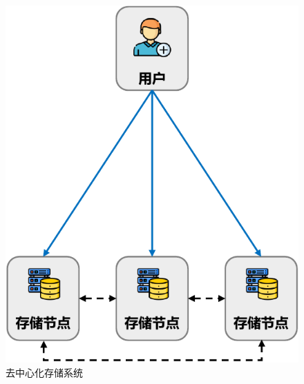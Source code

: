 \begin{figure}[t]
    \centering
	\begin{minipage}{0.45\linewidth}
        \centering
        \includegraphics[width=1\textwidth]{figures/timechain/filedes.pdf}
        \caption{去中心化存储系统}
        \label{fig:filedes}
	\end{minipage}
	\quad
	\begin{minipage}{0.45\linewidth}
        \centering

\end{minipage}
\end{figure}

